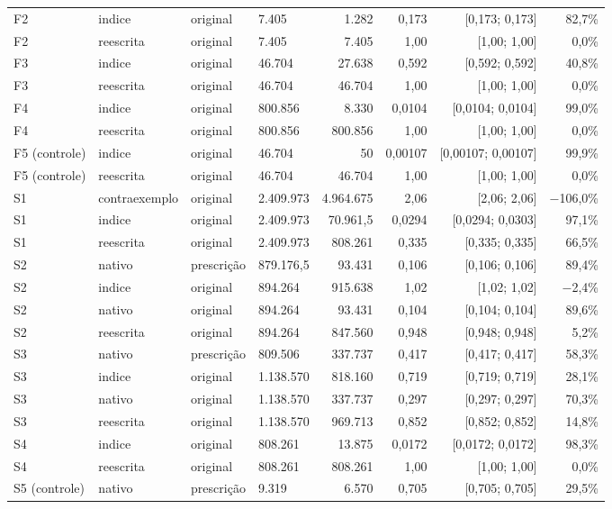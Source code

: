 {\begin{tabular}{llllrrrr}
F2 & indice & original & 7.405 & 1.282 & 0,173 & [0,173; 0,173] & 82,7\% \\
F2 & reescrita & original & 7.405 & 7.405 & 1,00 & [1,00; 1,00] & 0,0\% \\
F3 & indice & original & 46.704 & 27.638 & 0,592 & [0,592; 0,592] & 40,8\% \\
F3 & reescrita & original & 46.704 & 46.704 & 1,00 & [1,00; 1,00] & 0,0\% \\
F4 & indice & original & 800.856 & 8.330 & 0,0104 & [0,0104; 0,0104] & 99,0\% \\
F4 & reescrita & original & 800.856 & 800.856 & 1,00 & [1,00; 1,00] & 0,0\% \\
F5 (controle) & indice & original & 46.704 & 50 & 0,00107 & [0,00107; 0,00107] & 99,9\% \\
F5 (controle) & reescrita & original & 46.704 & 46.704 & 1,00 & [1,00; 1,00] & 0,0\% \\
S1 & contraexemplo & original & 2.409.973 & 4.964.675 & 2,06 & [2,06; 2,06] & $-$106,0\% \\
S1 & indice & original & 2.409.973 & 70.961,5 & 0,0294 & [0,0294; 0,0303] & 97,1\% \\
S1 & reescrita & original & 2.409.973 & 808.261 & 0,335 & [0,335; 0,335] & 66,5\% \\
S2 & nativo & prescrição & 879.176,5 & 93.431 & 0,106 & [0,106; 0,106] & 89,4\% \\
S2 & indice & original & 894.264 & 915.638 & 1,02 & [1,02; 1,02] & $-$2,4\% \\
S2 & nativo & original & 894.264 & 93.431 & 0,104 & [0,104; 0,104] & 89,6\% \\
S2 & reescrita & original & 894.264 & 847.560 & 0,948 & [0,948; 0,948] & 5,2\% \\
S3 & nativo & prescrição & 809.506 & 337.737 & 0,417 & [0,417; 0,417] & 58,3\% \\
S3 & indice & original & 1.138.570 & 818.160 & 0,719 & [0,719; 0,719] & 28,1\% \\
S3 & nativo & original & 1.138.570 & 337.737 & 0,297 & [0,297; 0,297] & 70,3\% \\
S3 & reescrita & original & 1.138.570 & 969.713 & 0,852 & [0,852; 0,852] & 14,8\% \\
S4 & indice & original & 808.261 & 13.875 & 0,0172 & [0,0172; 0,0172] & 98,3\% \\
S4 & reescrita & original & 808.261 & 808.261 & 1,00 & [1,00; 1,00] & 0,0\% \\
S5 (controle) & nativo & prescrição & 9.319 & 6.570 & 0,705 & [0,705; 0,705] & 29,5\% \\

\end{tabular}}
